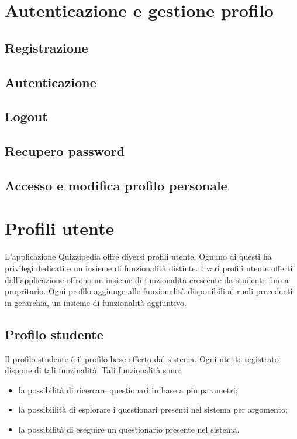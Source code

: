 \documentclass[12pt,a4paper]{article}
\begin{document}
	\newpage

	\section{Autenticazione e gestione profilo}
	\subsection{Registrazione}
	\subsection{Autenticazione}
	\subsection{Logout}
	\subsection{Recupero password}
	\subsection{Accesso e modifica profilo personale}
	
	\section{Profili utente}
	L'applicazione Quizzipedia offre diversi profili utente. Ognuno di questi ha privilegi dedicati e un insieme di funzionalità distinte.
	I vari profili utente offerti dall'applicazione offrono un insieme di funzionalità crescente da studente fino a propritario.
	Ogni profilo aggiunge alle funzionalità disponibili ai ruoli precedenti in gerarchia, un insieme di funzionalità aggiuntivo.

	\subsection{Profilo studente}
	Il profilo studente è il profilo  base offerto dal sistema. Ogni utente registrato dispone di tali funzinalità. Tali funzionalità sono:
	\begin{itemize}
		\item la possibilità di ricercare questionari in base a piu parametri;
		\item la possibiilità di esplorare i questionari presenti nel sistema per argomento;
		\item la possibilità di eseguire un questionario presente nel sistema.
	\end{itemize}
\end{document}
